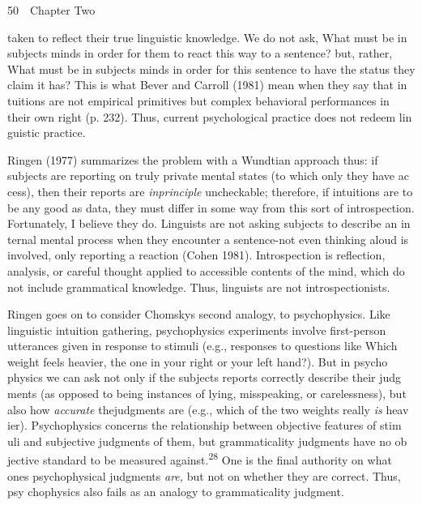 \clearpage\setcounter{page}{1}\begin{styleStandard}
50\ \ Chapter Two
\end{styleStandard}


\begin{styleTextbody}
taken to reflect their true linguistic knowledge. We do not ask, {\textquotedbl}What must be in subjects{\textquotesingle} minds in order for them to react this way to a sentence?{\textquotedbl} but, rather, {\textquotedbl}What must be in subjects{\textquotesingle} minds in order for this sentence to have the status they claim it has?{\textquotedbl} This is what Bever and Carroll (1981) mean when they say that {\textquotedbl}in\- tuitions are not empirical primitives but complex behavioral performances in their own right{\textquotedbl} (p. 232). Thus, current psychological practice does not redeem lin\- guistic practice.
\end{styleTextbody}


\begin{styleTextbody}
Ringen (1977) summarizes the problem with a Wundtian approach thus: if subjects are reporting on truly private mental states (to which only they have ac\- cess), then their reports are \textit{i}\textit{n}\textit{principle}\textit{ }uncheckable; therefore, if intuitions are to be any good as data, they must differ in some way from this sort of introspection. Fortunately, I believe they do. Linguists are not asking subjects to describe an in\- ternal mental process when they encounter a sentence-not even thinking aloud is involved, only reporting a reaction (Cohen 1981). Introspection is reflection, analysis, or careful thought applied to accessible contents of the mind, which do not include grammatical knowledge. Thus, linguists are not introspectionists.
\end{styleTextbody}


\begin{styleTextbody}
Ringen goes on to consider Chomsky{\textquotesingle}s second analogy, to psychophysics. Like linguistic intuition gathering, psychophysics experiments involve first-person utterances given in response to stimuli (e.g., responses to questions like {\textquotedbl}Which weight feels heavier, the one in your right or your left hand?{\textquotedbl}). But in psycho\- physics we can ask not only if the subjects{\textquotesingle} reports correctly describe their judg\- ments (as opposed to being instances of lying, misspeaking, or carelessness), but also how \textit{accurate}\textit{ }thejudgments are (e.g., which of the two weights really \textit{is}\textit{ }heav\- ier). Psychophysics concerns the relationship between objective features of stim\- uli and subjective judgments of them, but grammaticality judgments have no ob\- jective standard to be measured against.\textsuperscript{28}\textsuperscript{ }One is the final authority on what one{\textquotesingle}s psychophysical judgments \textit{are,}\textit{ }but not on whether they are correct. Thus, psy\- chophysics also fails as an analogy to grammaticality judgment.
\end{styleTextbody}


